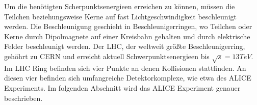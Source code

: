Um die ben\"otigten Scherpunktsenergieen erreichen zu k\"onnen, m\"ussen die Teilchen beziehungsweise Kerne auf fast Lichtgeschwindigkeit beschleunigt werden.
Die Beschleunigung geschieht in Beschleunigerringen, wo Teilchen oder Kerne durch Dipolmagnete auf einer Kreisbahn gehalten und durch elektrische Felder beschleunigt werden.
Der LHC, der weltweit gr\"o{\ss}te Beschleunigerring, geh\"ohrt zu CERN und erreicht aktuell Schwerpunktsenergieen bis $\sqrt{s} = 13 TeV$.
Im LHC Ring befinden sich vier Punkte an denen Kollisionen stattfinden.
An diesen vier befinden sich umfangreiche Detektorkomplexe, wie etwa des ALICE Experiments.
Im folgenden Abschnitt wird das ALICE Experiment genauer beschrieben.